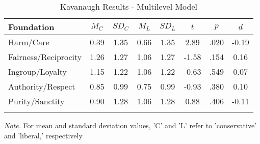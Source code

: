 \documentclass[
  english,
  man]{apa6}
\begin{document}
\begin{table}[pt]

\begin{center}
\begin{threeparttable}

\caption{\label{tab:exp2-tablekav}Kavanaugh Results - Multilevel Model}

\footnotesize{

\begin{tabular}{lccccccc}
\toprule
Foundation & $M_C$ & $SD_C$ & $M_L$ & $SD_L$ & $t$ & $p$ & $d$\\
\midrule
Harm/Care & 0.39 & 1.35 & 0.66 & 1.35 & 2.89 & .020 & -0.19\\
Fairness/Reciprocity & 1.26 & 1.27 & 1.06 & 1.27 & -1.58 & .154 & 0.16\\
Ingroup/Loyalty & 1.15 & 1.22 & 1.06 & 1.22 & -0.63 & .549 & 0.07\\
Authority/Respect & 0.85 & 0.99 & 0.75 & 0.99 & -0.93 & .380 & 0.10\\
Purity/Sanctity & 0.90 & 1.28 & 1.06 & 1.28 & 0.88 & .406 & -0.11\\
\bottomrule
\addlinespace
\end{tabular}

}

\begin{tablenotes}[para]
\normalsize{\textit{Note.} For mean and standard deviation values, 'C' and 'L' refer to 'conservative' and 'liberal,' respectively}
\end{tablenotes}

\end{threeparttable}
\end{center}

\end{table}
\end{document}
